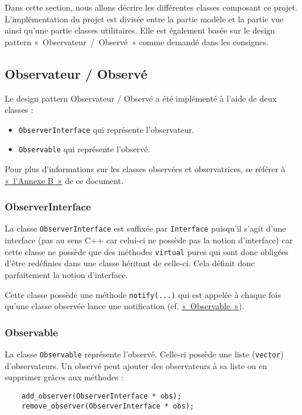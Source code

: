\documentclass[]{report}
\begin{document}
Dans cette section, nous allons décrire les différentes classes
composant ce projet.
L’implémentation du projet est divisée entre la partie modèle et la partie vue ainsi 
qu'une partie classes utilitaires.
Elle est également basée sur le design pattern «~Observateur~/~Observé~» comme demandé
dans les consignes. 

\subsection{\label{OO}Observateur / Observé}

Le design pattern Observateur / Observé a été implémenté à l'aide de deux classes : 

\begin{itemize}
    \item \texttt{ObserverInterface} qui représente l'observateur.
    \item \texttt{Observable} qui représente l'observé.
\end{itemize}

Pour plus d'informations sur les classes observées et observatrices, se référer à
\hyperref[AnnexeB]{«~l'Annexe B~»} de ce document.

\subsubsection{ObserverInterface}

La classe \texttt{ObserverInterface} est suffixée par \texttt{Interface} puisqu'il
s'agit d'une interface (pas au sens C++ car celui-ci ne possède pas la notion
d'interface) car cette classe ne possède que des méthodes \texttt{virtual} pures
qui sont donc obligées d'être redéfinies dans une classe héritant de celle-ci.
Cela définit donc parfaitement la notion d'interface.

Cette classe possède une méthode \texttt{notify(...)} qui est appelée à chaque fois
qu'une classe observée lance une notification (cf. \hyperref[Observable]{«~Observable~»}).

\subsubsection{\label{Observable}Observable}

La classe \texttt{Observable} représente l'observé. Celle-ci possède
une liste (\texttt{vector}) d'observateurs.
Un observé peut ajouter des observateurs à sa liste ou en supprimer grâces aux méthodes :
\begin{lstlisting}
    add_observer(ObserverInterface * obs);
    remove_observer(ObserverInterface * obs);
\end{lstlisting}
\end{document}
